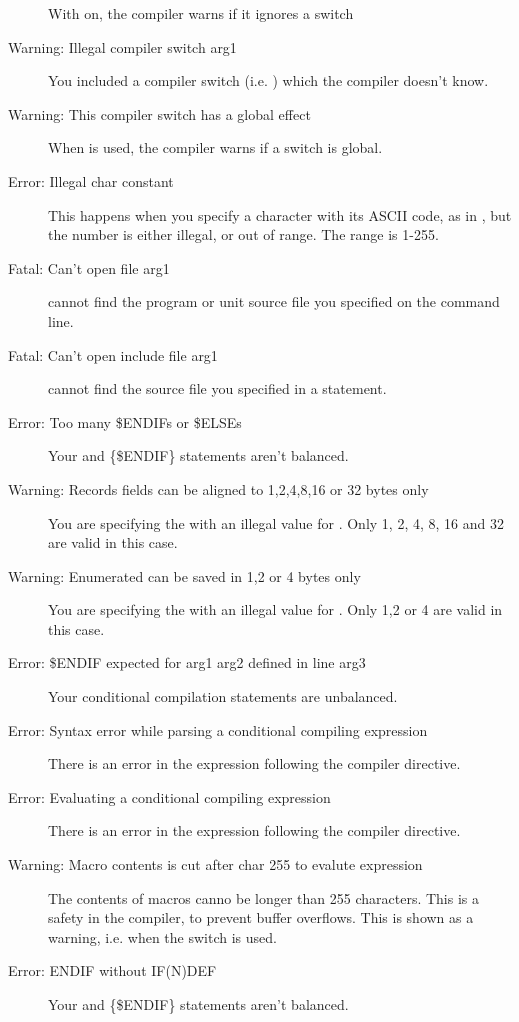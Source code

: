 \begin{description}
 With  on, the compiler warns if it ignores a switch
\item [Warning: Illegal compiler switch arg1]
 You included a compiler switch (i.e. ) which the compiler
 doesn't know.
\item [Warning: This compiler switch has a global effect]
 When  is used, the compiler warns if a switch is global.
\item [Error: Illegal char constant]
 This happens when you specify a character with its ASCII code, as in
 , but the number is either illegal, or out of range. The range
 is 1-255.
\item [Fatal: Can't open file arg1]
 \fpc cannot find the program or unit source file you specified on the
 command line.
\item [Fatal: Can't open include file arg1]
 \fpc cannot find the source file you specified in a 
 statement.
\item [Error: Too many \$ENDIFs or \$ELSEs]
 Your  and {\{\$ENDIF\}} statements aren't balanced.
\item [Warning: Records fields can be aligned to 1,2,4,8,16 or 32 bytes only]
 You are specifying the  with an illegal value for
 . Only 1, 2, 4, 8, 16 and 32 are valid in this case.
\item [Warning: Enumerated can be saved in 1,2 or 4 bytes only]
 You are specifying the  with an illegal value for
 . Only 1,2 or 4 are valid in this case.
\item [Error: \$ENDIF expected for arg1 arg2 defined in line arg3]
 Your conditional compilation statements are unbalanced.
\item [Error: Syntax error while parsing a conditional compiling expression]
 There is an error in the expression following the  compiler
 directive.
\item [Error: Evaluating a conditional compiling expression]
 There is an error in the expression following the  compiler
 directive.
\item [Warning: Macro contents is cut after char 255 to evalute expression]
 The contents of macros canno be longer than 255 characters. This is a
 safety in the compiler, to prevent buffer overflows. This is shown as a
 warning, i.e. when the  switch is used.
\item [Error: ENDIF without IF(N)DEF]
 Your  and {\{\$ENDIF\}} statements aren't balanced.

\end{description}
